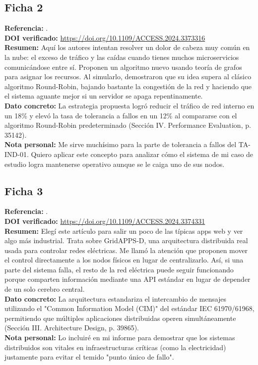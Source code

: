 \documentclass[12pt,a4paper]{article}
\begin{document}
\subsection*{Ficha 2}
\textbf{Referencia:} . \\
\textbf{DOI verificado:} \url{https://doi.org/10.1109/ACCESS.2024.3373316} \\
\textbf{Resumen:} Aquí los autores intentan resolver un dolor de cabeza muy común en la nube: el exceso de tráfico y las caídas cuando tienes muchos microservicios comunicándose entre sí. Proponen un algoritmo nuevo usando teoría de grafos para asignar los recursos. Al simularlo, demostraron que su idea supera al clásico algoritmo Round-Robin, bajando bastante la congestión de la red y haciendo que el sistema aguante mejor si un servidor se apaga repentinamente. \\
\textbf{Dato concreto:} La estrategia propuesta logró reducir el tráfico de red interno en un 18\% y elevó la tasa de tolerancia a fallos en un 12\% al compararse con el algoritmo Round-Robin predeterminado (Sección IV. Performance Evaluation, p. 35142). \\
\textbf{Nota personal:} Me sirve muchísimo para la parte de tolerancia a fallos del TA-IND-01. Quiero aplicar este concepto para analizar cómo el sistema de mi caso de estudio logra mantenerse operativo aunque se le caiga uno de sus nodos.

\subsection*{Ficha 3}
\textbf{Referencia:} . \\
\textbf{DOI verificado:} \url{https://doi.org/10.1109/ACCESS.2024.3374331} \\
\textbf{Resumen:} Elegí este artículo para salir un poco de las típicas apps web y ver algo más industrial. Trata sobre GridAPPS-D, una arquitectura distribuida real usada para controlar redes eléctricas. Me llamó la atención que proponen mover el control directamente a los nodos físicos en lugar de centralizarlo. Así, si una parte del sistema falla, el resto de la red eléctrica puede seguir funcionando porque comparten información mediante una API estándar en lugar de depender de un solo cerebro central. \\
\textbf{Dato concreto:} La arquitectura estandariza el intercambio de mensajes utilizando el "Common Information Model (CIM)" del estándar IEC 61970/61968, permitiendo que múltiples aplicaciones distribuidas operen simultáneamente (Sección III. Architecture Design, p. 39865). \\
\textbf{Nota personal:} Lo incluiré en mi informe para demostrar que los sistemas distribuidos son vitales en infraestructuras críticas (como la electricidad) justamente para evitar el temido "punto único de fallo".
\end{document}

